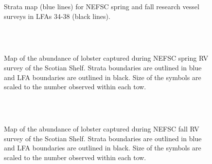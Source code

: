 \documentclass[11pt]{article}
\newcommand{\D}{.}
\newcommand{\e}{/SpinDr/backup/bio_data/bio.lobster/figures/LFA3438Framework2019/} %
\begin{document}
    \begin{figure}
    \centering
        \caption{Strata map (blue lines) for NEFSC spring and fall research vessel surveys in LFAs 34-38 (black lines).}
    \end{figure}


        \begin{figure}
        \centering
           \\
        \\
    
       \caption{Map of the abundance of lobster captured during NEFSC spring RV survey of the Scotian Shelf. Strata boundaries are outlined in blue and LFA  boundaries are outlined in black. Size of the symbols are scaled to the number observed within each tow.}
        \end{figure}
        \clearpage


        \begin{figure}
        \centering
           \\
        \\
    
       \caption{Map of the abundance of lobster captured during NEFSC fall RV survey of the Scotian Shelf. Strata boundaries are outlined in blue and LFA  boundaries are outlined in black. Size of the symbols are scaled to the number observed within each tow.}
        \end{figure}
        \clearpage
\end{document}
